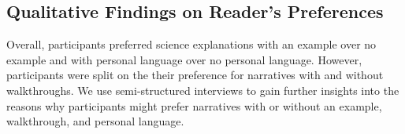 



\subsection{Qualitative Findings on Reader's Preferences}

Overall, participants preferred science explanations with an example over no example and with personal language over no personal language. However, participants were split on the their preference for narratives with and without walkthroughs. We use semi-structured interviews to gain further insights into the reasons why participants might prefer narratives with or without an example, walkthrough, and personal language.

